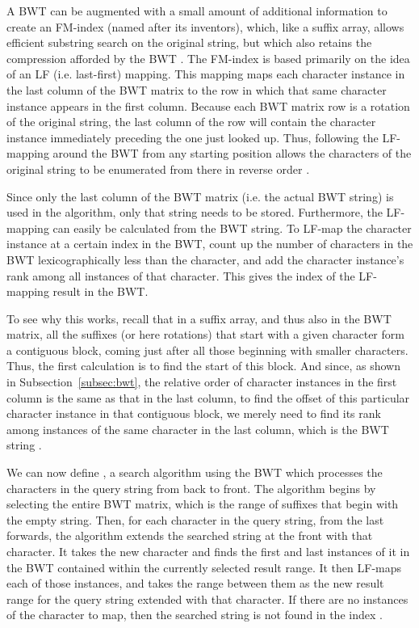 A BWT can be augmented with a small amount of additional information to create an FM-index (named after its inventors), which, like a suffix array, allows efficient substring search on the original string, but which also retains the compression afforded by the BWT \cite{ferragina2000opportunistic}. The FM-index is based primarily on the idea of an LF (i.e. last-first) mapping. This mapping maps each character instance in the last column of the BWT matrix to the row in which that same character instance appears in the first column. Because each BWT matrix row is a rotation of the original string, the last column of the row will contain the character instance immediately preceding the one just looked up. Thus, following the LF-mapping around the BWT from any starting position allows the characters of the original string to be enumerated from there in reverse order \cite{ferragina2000opportunistic}.

Since only the last column of the BWT matrix (i.e. the actual BWT string) is used in the algorithm, only that string needs to be stored. Furthermore, the LF-mapping can easily be calculated from the BWT string. To LF-map the character instance at a certain index in the BWT, count up the number of characters in the BWT lexicographically less than the character, and add the character instance's rank among all instances of that character. This gives the index of the LF-mapping result in the BWT.

To see why this works, recall that in a suffix array, and thus also in the BWT matrix, all the suffixes (or here rotations) that start with a given character form a contiguous block, coming just after all those beginning with smaller characters. Thus, the first calculation is to find the start of this block. And since, as shown in Subsection~\ref{subsec:bwt}, the relative order of character instances in the first column is the same as that in the last column, to find the offset of this particular character instance in that contiguous block, we merely need to find its rank among instances of the same character in the last column, which is the BWT string \cite{langmead2013introduction}.

We can now define , a search algorithm using the BWT which processes the characters in the query string from back to front. The algorithm begins by selecting the entire BWT matrix, which is the range of suffixes that begin with the empty string. Then, for each character in the query string, from the last forwards, the algorithm extends the searched string at the front with that character. It takes the new character and finds the first and last instances of it in the BWT contained within the currently selected result range. It then LF-maps each of those instances, and takes the range between them as the new result range for the query string extended with that character. If there are no instances of the character to map, then the searched string is not found in the index \cite{ferragina2000opportunistic}.

